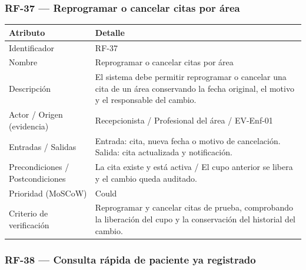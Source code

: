\documentclass[11pt,a4paper]{article}
\begin{document}
	\subsubsection{RF-37 --- Reprogramar o cancelar citas por área}
	\begin{longtable}{p{} p{}}
		\toprule
		\textbf{Atributo} & \textbf{Detalle} \\
		\midrule
		\endhead
		Identificador & RF-37 \\
		Nombre & Reprogramar o cancelar citas por área \\
		Descripción & El sistema debe permitir reprogramar o cancelar una cita de un área conservando la fecha original, el motivo y el responsable del cambio. \\
		Actor / Origen (evidencia) & Recepcionista / Profesional del área / EV-Enf-01 \\
		Entradas / Salidas & Entrada: cita, nueva fecha o motivo de cancelación. Salida: cita actualizada y notificación. \\
		Precondiciones / Postcondiciones & La cita existe y está activa / El cupo anterior se libera y el cambio queda auditado. \\
		Prioridad (MoSCoW) & Could \\
		Criterio de verificación & Reprogramar y cancelar citas de prueba, comprobando la liberación del cupo y la conservación del historial del cambio. \\
		\bottomrule
	\end{longtable}
	
	\subsubsection{RF-38 --- Consulta rápida de paciente ya registrado}
	
\end{document}
